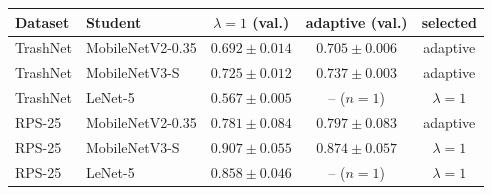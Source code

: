 \begin{tabular}{@{}llccc@{}}
\toprule
Dataset & Student & $\lambda{=}1$ (val.) & adaptive (val.) & selected \\
\midrule
TrashNet & MobileNetV2-0.35 & $0.692\pm0.014$ & $0.705\pm0.006$ & adaptive \\
TrashNet & MobileNetV3-S & $0.725\pm0.012$ & $0.737\pm0.003$ & adaptive \\
TrashNet & LeNet-5 & $0.567\pm0.005$ & -- ($n{=}1$) & $\lambda{=}1$ \\
RPS-25 & MobileNetV2-0.35 & $0.781\pm0.084$ & $0.797\pm0.083$ & adaptive \\
RPS-25 & MobileNetV3-S & $0.907\pm0.055$ & $0.874\pm0.057$ & $\lambda{=}1$ \\
RPS-25 & LeNet-5 & $0.858\pm0.046$ & -- ($n{=}1$) & $\lambda{=}1$ \\
\bottomrule
\end{tabular}

